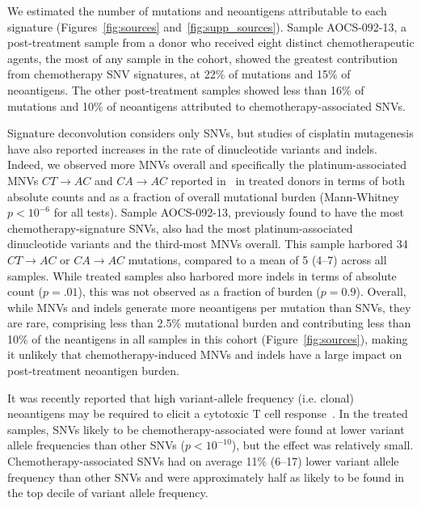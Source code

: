 We estimated the number of mutations and neoantigens attributable to each signature (Figures~\ref{fig:sources} and~\ref{fig:supp_sources}). Sample AOCS-092-13, a post-treatment sample from a donor who received eight distinct chemotherapeutic agents, the most of any sample in the cohort, showed the greatest contribution from chemotherapy SNV signatures, at 22\% of mutations and 15\% of neoantigens. The other post-treatment samples showed less than 16\% of mutations and 10\% of neoantigens attributed to chemotherapy-associated SNVs.

Signature deconvolution considers only SNVs, but studies of cisplatin mutagenesis have also reported increases in the rate of dinucleotide variants and indels. Indeed, we observed more MNVs overall and specifically the platinum-associated MNVs $CT \rightarrow AC$ and $CA \rightarrow AC$ reported in~\cite{Meier_2014} in treated donors in terms of both absolute counts and as a fraction of overall mutational burden (Mann-Whitney $p < 10^{-6}$ for all tests). Sample AOCS-092-13, previously found to have the most chemotherapy-signature SNVs, also had the most platinum-associated dinucleotide variants and the third-most MNVs overall. This sample harbored 34 $CT \rightarrow AC$ or $CA \rightarrow AC$ mutations, compared to a mean of 5 (4--7) across all samples. While treated samples also harbored more indels in terms of absolute count ($p=.01$), this was not observed as a fraction of burden ($p=0.9$). Overall, while MNVs and indels generate more neoantigens per mutation than SNVs, they are rare, comprising less than 2.5\% mutational burden and contributing less than 10\% of the neantigens in all samples in this cohort (Figure~\ref{fig:sources}), making it unlikely that chemotherapy-induced MNVs and indels have a large impact on post-treatment neoantigen burden.

It was recently reported that high variant-allele frequency (i.e. clonal) neoantigens may be required to elicit a cytotoxic T cell response~\cite{McGranahan_2016}. In the treated samples, SNVs likely to be chemotherapy-associated were found at lower variant allele frequencies than other SNVs ($p < 10^{-10}$), but the effect was relatively small. Chemotherapy-associated SNVs had on average 11\% (6--17) lower variant allele frequency than other SNVs and were approximately half as likely to be found in the top decile of variant allele frequency.